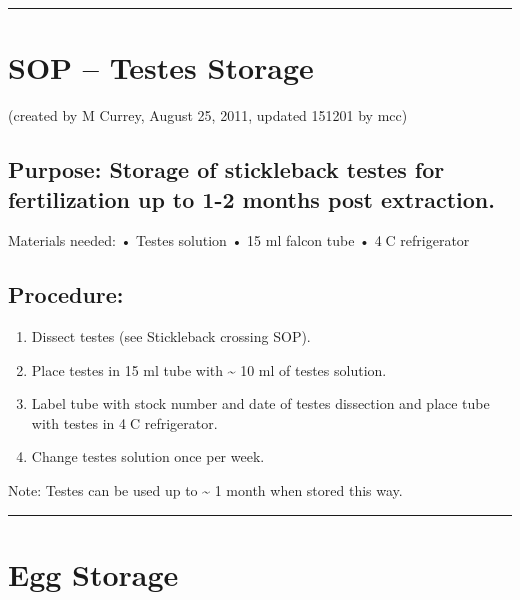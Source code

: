 \documentclass[
]{book}
\providecommand{\tightlist}{%
  \setlength{\itemsep}{0pt}\setlength{\parskip}{0pt}}
\begin{document}
\begin{center}\rule{0.5\linewidth}{0.5pt}\end{center}

\hypertarget{sop-testes-storage}{%
\section{SOP -- Testes Storage}\label{sop-testes-storage}}

(created by M Currey, August 25, 2011, updated 151201 by mcc)

\hypertarget{purpose-storage-of-stickleback-testes-for-fertilization-up-to-1-2-months-post-extraction.}{%
\subsection{Purpose: Storage of stickleback testes for fertilization up to 1-2 months post extraction.}\label{purpose-storage-of-stickleback-testes-for-fertilization-up-to-1-2-months-post-extraction.}}

Materials needed:
• Testes solution
• 15 ml falcon tube
• 4C refrigerator

\hypertarget{procedure-1}{%
\subsection{Procedure:}\label{procedure-1}}

\begin{enumerate}
\def\labelenumi{\arabic{enumi}.}
\tightlist
\item
  Dissect testes (see Stickleback crossing SOP).
\item
  Place testes in 15 ml tube with \textasciitilde{} 10 ml of testes solution.
\item
  Label tube with stock number and date of testes dissection and place tube with testes in 4C refrigerator.
\item
  Change testes solution once per week.
\end{enumerate}

Note: Testes can be used up to \textasciitilde{} 1 month when stored this way.

\begin{center}\rule{0.5\linewidth}{0.5pt}\end{center}

\hypertarget{egg-storage}{%
\section{Egg Storage}\label{egg-storage}}
\end{document}
